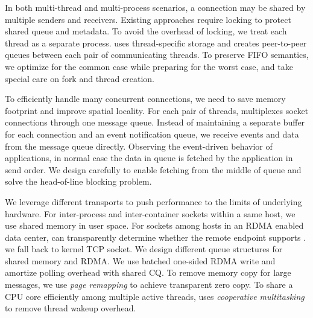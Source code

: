 In both multi-thread and multi-process scenarios, a connection may be shared by multiple senders and receivers.
Existing approaches require locking to protect shared queue and metadata.
To avoid the overhead of locking, we treat each thread as a separate process.
\libipc{} uses thread-specific storage and creates peer-to-peer queues between each pair of communicating threads.
To preserve FIFO semantics, we optimize for the common case while preparing for the worst case, and take special care on fork and thread creation.

To efficiently handle many concurrent connections, we need to save memory footprint and improve spatial locality.
For each pair of threads, \sys multiplexes socket connections through one message queue.
Instead of maintaining a separate buffer for each connection and an event notification queue, we receive events and data from the message queue directly.
Observing the event-driven behavior of applications, in normal case the data in queue is fetched by the application in send order.
We design carefully to enable fetching from the middle of queue and solve the head-of-line blocking problem.

We leverage different transports to push performance to the limits of underlying hardware.
For inter-process and inter-container sockets within a same host, we use shared memory in user space.
For sockets among hosts in an RDMA enabled data center, \sys can transparently determine whether the remote endpoint supports \sys.
we fall back to kernel TCP socket.
We design different queue structures for shared memory and RDMA.
We use batched one-sided RDMA write and amortize polling overhead with shared CQ.
To remove memory copy for large messages, we use \emph{page remapping} to achieve transparent zero copy.
To share a CPU core efficiently among multiple active threads, \sys uses \emph{cooperative multitasking} to remove thread wakeup overhead.


